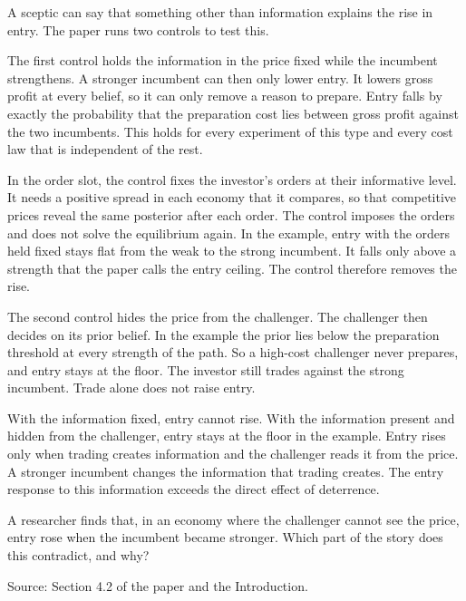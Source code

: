A sceptic can say that something other than information explains the rise in entry. The paper runs two controls to test this.

The first control holds the information in the price fixed while the incumbent strengthens. A stronger incumbent can then only lower entry. It lowers gross profit at every belief, so it can only remove a reason to prepare. Entry falls by exactly the probability that the preparation cost lies between gross profit against the two incumbents. This holds for every experiment of this type and every cost law that is independent of the rest.

In the order slot, the control fixes the investor's orders at their informative level. It needs a positive spread in each economy that it compares, so that competitive prices reveal the same posterior after each order. The control imposes the orders and does not solve the equilibrium again. In the example, entry with the orders held fixed stays flat from the weak to the strong incumbent. It falls only above a strength that the paper calls the entry ceiling. The control therefore removes the rise.

The second control hides the price from the challenger. The challenger then decides on its prior belief. In the example the prior lies below the preparation threshold at every strength of the path. So a high-cost challenger never prepares, and entry stays at the floor. The investor still trades against the strong incumbent. Trade alone does not raise entry.

\begin{intuition}
With the information fixed, entry cannot rise. With the information present and hidden from the challenger, entry stays at the floor in the example. Entry rises only when trading creates information and the challenger reads it from the price. A stronger incumbent changes the information that trading creates. The entry response to this information exceeds the direct effect of deterrence.
\end{intuition}

\begin{checkyourself}
A researcher finds that, in an economy where the challenger cannot see the price, entry rose when the incumbent became stronger. Which part of the story does this contradict, and why?\label{q:story-hidden}
\end{checkyourself}

{\small\color{notegrey}Source: Section 4.2 of the paper and the Introduction.}

